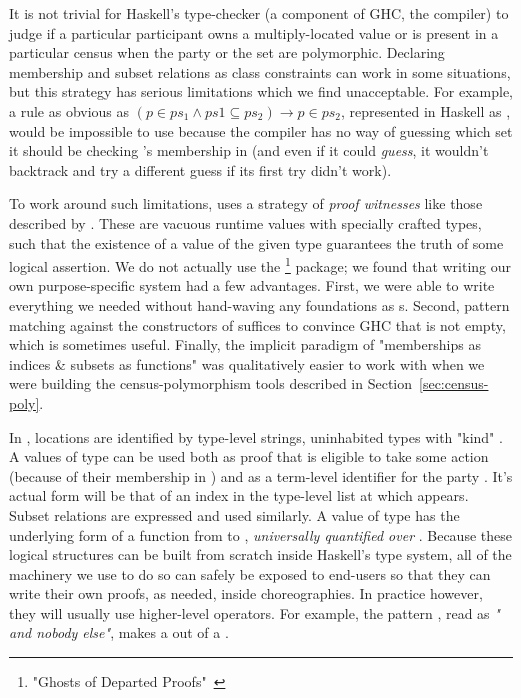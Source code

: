 It is not trivial for Haskell's type-checker (a component of GHC, the compiler) to judge if
a particular participant owns a multiply-located value or is present in a particular census
when the party or the set are polymorphic.
Declaring membership and subset relations as class constraints can work in some situations,
but this strategy has serious limitations which we find unacceptable.
For example, a rule as obvious as
$(p \in ps_1 \land ps1 \subseteq ps_2) \to p \in ps_2$,
represented in Haskell as
,
would be impossible to use because the compiler has no way of guessing which set 
it should be checking 's membership in
(and even if it could \emph{guess}, it wouldn't backtrack and try a different guess if its first try didn't work).

To work around such limitations, \MultiChor uses a strategy of \emph{proof witnesses}
like those described by \cite{noonanGDP}.
These are vacuous runtime values with specially crafted types,
such that the existence of a value of the given type guarantees the truth of some logical assertion.
We do not actually use the \footnote{
    "Ghosts of Departed Proofs"~\cite{gdp_hackage}
} package; we found that writing our own purpose-specific system had a few advantages.
First, we were able to write everything we needed without hand-waving any foundations as s.
Second, pattern matching against the constructors of  suffices to convince GHC that  is not empty,
which is sometimes useful.
Finally, the implicit paradigm of "memberships as indices \& subsets as functions" was qualitatively easier to work with
when we were building the census-polymorphism tools described in Section~\ref{sec:census-poly}.

In \MultiChor, locations are identified by type-level strings, uninhabited types with "kind" .
A values of type  can be used both
as proof that  is eligible to take some action (because of their membership in )
and as a term-level identifier for the party .
It's actual form will be that of an index in the type-level list  at which  appears.
Subset relations are expressed and used similarly.
A value of type  has the underlying form of a function
from  to ,
\emph{universally quantified over }.
Because these logical structures can be built from scratch inside Haskell's type system,
all of the machinery we use to do so can safely be exposed to end-users so that they can write their own proofs, as needed, inside choreographies.
In practice however, they will usually use higher-level operators.
For example, the pattern , read as \emph{" and nobody else"},
makes a  out of a .


